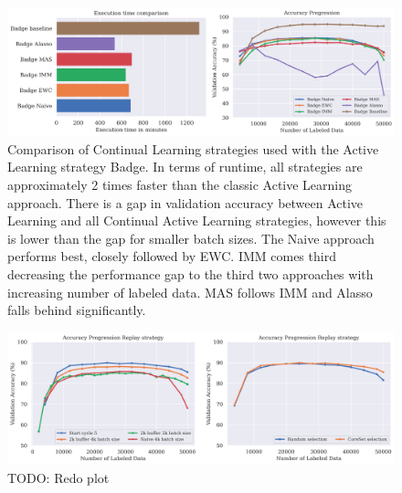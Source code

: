\begin{figure} [ht]
    \centering
    \includegraphics[width=\linewidth]{images/results_CAL/Badge_CAL_4000b.png}
    \caption[Continual Active Learning Badge 4000 batch size]{Comparison of Continual Learning strategies used with the Active Learning strategy Badge. In terms of runtime, all
    strategies are approximately 2 times faster than the classic Active Learning approach. There is a gap in validation accuracy between Active Learning and all Continual
    Active Learning strategies, however this is lower than the gap for smaller batch sizes. The Naive approach performs best, closely followed by EWC. IMM comes third decreasing the
    performance gap to the third two approaches with increasing number of labeled data. MAS follows IMM and Alasso falls behind significantly.}
    \label{fig:Evaluation:Results:CAL:Badge4000}
\end{figure}


\begin{figure} [ht]
    \centering
    \includegraphics[width=\linewidth]{images/results_CAL/replay_CAL.png}
    \caption[Continual Active Learning Badge 4000 batch size]{TODO: Redo plot}
    \label{fig:Evaluation:Results:CAL:Replay}
\end{figure}

